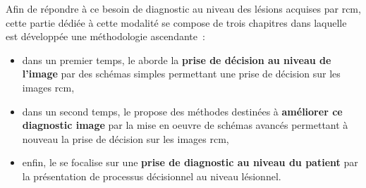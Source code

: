 Afin de répondre à ce besoin de diagnostic au niveau des lésions acquises par \gls{rcm}, cette partie dédiée à cette modalité se compose de trois chapitres dans laquelle est développée une méthodologie ascendante~:
\begin{itemize}
    \item dans un premier temps, le  aborde la \textbf{prise de décision au niveau de l'image} par des schémas simples permettant une prise de décision sur les images \gls{rcm},
    \item dans un second temps, le  propose des méthodes destinées à \textbf{améliorer ce diagnostic image} par la mise en oeuvre de schémas avancés permettant à nouveau la prise de décision sur les images \gls{rcm},
    \item enfin, le  se focalise sur une \textbf{prise de diagnostic au niveau du patient} par la présentation de processus décisionnel au niveau lésionnel.
\end{itemize}\par
\newpage